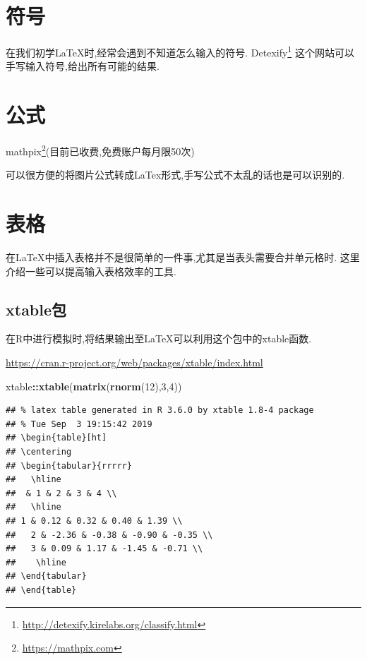 \documentclass[]{ctexbook}
\newenvironment{Shaded}{\begin{snugshade}}{\end{snugshade}}
\newcommand{\DecValTok}[1]{\textcolor[rgb]{0.00,0.00,0.81}{#1}}
\newcommand{\KeywordTok}[1]{\textcolor[rgb]{0.13,0.29,0.53}{\textbf{#1}}}
\newcommand{\NormalTok}[1]{#1}
\newcommand{\OperatorTok}[1]{\textcolor[rgb]{0.81,0.36,0.00}{\textbf{#1}}}
\renewcommand{\href}[2]{#2\footnote{\url{#1}}}
\begin{document}
\hypertarget{section-22}{%
\section{符号}\label{section-22}}

在我们初学LaTeX时,经常会遇到不知道怎么输入的符号.
\href{http://detexify.kirelabs.org/classify.html}{Detexify}
这个网站可以手写输入符号,给出所有可能的结果.

\hypertarget{section-23}{%
\section{公式}\label{section-23}}

\href{https://mathpix.com}{mathpix}(目前已收费,免费账户每月限50次)

可以很方便的将图片公式转成LaTex形式,手写公式不太乱的话也是可以识别的.

\hypertarget{section-24}{%
\section{表格}\label{section-24}}

在LaTeX中插入表格并不是很简单的一件事,尤其是当表头需要合并单元格时.
这里介绍一些可以提高输入表格效率的工具.

\hypertarget{xtable}{%
\subsection{xtable包}\label{xtable}}

在R中进行模拟时,将结果输出至LaTeX可以利用这个包中的xtable函数.

\url{https://cran.r-project.org/web/packages/xtable/index.html}

\begin{Shaded}
\begin{Highlighting}[]
\NormalTok{xtable}\OperatorTok{::}\KeywordTok{xtable}\NormalTok{(}\KeywordTok{matrix}\NormalTok{(}\KeywordTok{rnorm}\NormalTok{(}\DecValTok{12}\NormalTok{),}\DecValTok{3}\NormalTok{,}\DecValTok{4}\NormalTok{))}
\end{Highlighting}
\end{Shaded}

\begin{verbatim}
## % latex table generated in R 3.6.0 by xtable 1.8-4 package
## % Tue Sep  3 19:15:42 2019
## \begin{table}[ht]
## \centering
## \begin{tabular}{rrrrr}
##   \hline
##  & 1 & 2 & 3 & 4 \\ 
##   \hline
## 1 & 0.12 & 0.32 & 0.40 & 1.39 \\ 
##   2 & -2.36 & -0.38 & -0.90 & -0.35 \\ 
##   3 & 0.09 & 1.17 & -1.45 & -0.71 \\ 
##    \hline
## \end{tabular}
## \end{table}
\end{verbatim}
\end{document}
